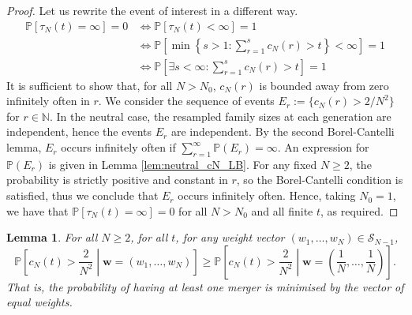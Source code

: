 \documentclass{article}
\newtheorem{lemma}{Lemma}
\newcommand{\PR}{\mathbb{P}}
\begin{document}
\begin{proof}
Let us rewrite the event of interest in a different way.
\begin{align*}
\PR[\tau_N(t) = \infty] =0 &\Leftrightarrow \PR[\tau_N(t) < \infty] =1 \\
&\Leftrightarrow \PR\left[ \min \left\{s>1 : \sum_{r=1}^s c_N(r) >t \right\} < \infty \right] =1 \\
&\Leftrightarrow \PR\left[ \exists s<\infty : \sum_{r=1}^s c_N(r) >t \right] =1
\end{align*}
It is sufficient to show that, for all $N>N_0$, $c_N(r)$ is bounded away from zero infinitely often in $r$.
We consider the sequence of events 
$E_r := \{ c_N(r) > 2/N^2 \}$ for $r \in \mathbb{N}$.
In the neutral case, the resampled family sizes at each generation are independent, hence the events $E_r$ are independent. 
By the second Borel-Cantelli lemma, $E_r$ occurs infinitely often if $\sum_{r=1}^\infty \PR(E_r) = \infty$. 
An expression for $\PR(E_r)$ is given in Lemma \ref{lem:neutral_cN_LB}. 
For any fixed $N\geq 2$, the probability is strictly positive and constant in $r$, so the Borel-Cantelli condition is satisfied, thus we conclude that $E_r$ occurs infinitely often.
Hence, taking $N_0=1$, we have that $\PR[\tau_N(t) = \infty] =0$ for all $N>N_0$ and all finite $t$, as required.
\end{proof}


\begin{lemma}\label{lem:mn_optimal_w}
For all $N\geq 2$, for all $t$, for any weight vector $(w_1, \dots, w_N) \in \mathcal{S}_{N-1}$,
\begin{equation*}
\PR \left[c_N(t) > \frac{2}{N^2} \middle| \mathbf{w}=(w_1, \dots, w_N) \right]
\geq \PR \left[c_N(t) > \frac{2}{N^2} \middle| \mathbf{w}=\left( \frac{1}{N}, \dots, \frac{1}{N} \right) \right] .
\end{equation*}
That is, the probability of having at least one merger is minimised by the vector of equal weights.
\end{lemma}
\end{document}

